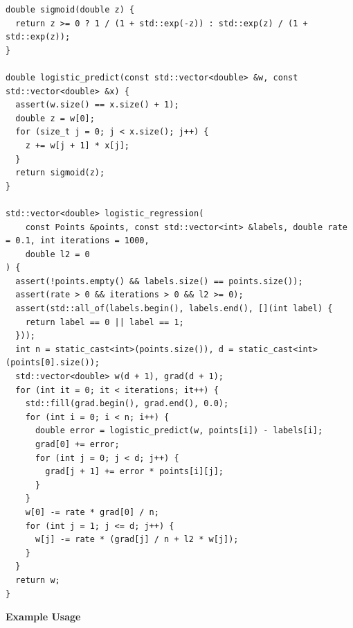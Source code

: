 \begin{lstlisting}[style=cpp]
double sigmoid(double z) {
  return z >= 0 ? 1 / (1 + std::exp(-z)) : std::exp(z) / (1 + std::exp(z));
}

double logistic_predict(const std::vector<double> &w, const std::vector<double> &x) {
  assert(w.size() == x.size() + 1);
  double z = w[0];
  for (size_t j = 0; j < x.size(); j++) {
    z += w[j + 1] * x[j];
  }
  return sigmoid(z);
}

std::vector<double> logistic_regression(
    const Points &points, const std::vector<int> &labels, double rate = 0.1, int iterations = 1000,
    double l2 = 0
) {
  assert(!points.empty() && labels.size() == points.size());
  assert(rate > 0 && iterations > 0 && l2 >= 0);
  assert(std::all_of(labels.begin(), labels.end(), [](int label) {
    return label == 0 || label == 1;
  }));
  int n = static_cast<int>(points.size()), d = static_cast<int>(points[0].size());
  std::vector<double> w(d + 1), grad(d + 1);
  for (int it = 0; it < iterations; it++) {
    std::fill(grad.begin(), grad.end(), 0.0);
    for (int i = 0; i < n; i++) {
      double error = logistic_predict(w, points[i]) - labels[i];
      grad[0] += error;
      for (int j = 0; j < d; j++) {
        grad[j + 1] += error * points[i][j];
      }
    }
    w[0] -= rate * grad[0] / n;
    for (int j = 1; j <= d; j++) {
      w[j] -= rate * (grad[j] / n + l2 * w[j]);
    }
  }
  return w;
}
\end{lstlisting}
\textbf{Example Usage}\par
